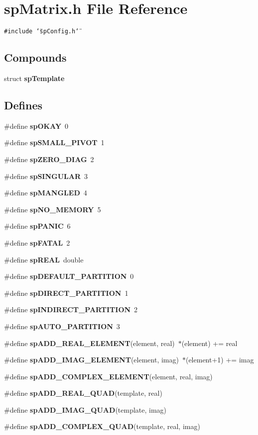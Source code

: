 \section{sp\-Matrix.h File Reference}
\label{spMatrix_8h}
{\tt \#include \char`\"{}sp\-Config.h\char`\"{}}\par
\subsection*{Compounds}
\begin{CompactItemize}
\item 
struct {\bf sp\-Template}
\end{CompactItemize}
\subsection*{Defines}
\begin{CompactItemize}
\item 
\#define {\bf sp\-OKAY}\ 0
\item 
\#define {\bf sp\-SMALL\_\-PIVOT}\ 1
\item 
\#define {\bf sp\-ZERO\_\-DIAG}\ 2
\item 
\#define {\bf sp\-SINGULAR}\ 3
\item 
\#define {\bf sp\-MANGLED}\ 4
\item 
\#define {\bf sp\-NO\_\-MEMORY}\ 5
\item 
\#define {\bf sp\-PANIC}\ 6
\item 
\#define {\bf sp\-FATAL}\ 2
\item 
\#define {\bf sp\-REAL}\ double
\item 
\#define {\bf sp\-DEFAULT\_\-PARTITION}\ 0
\item 
\#define {\bf sp\-DIRECT\_\-PARTITION}\ 1
\item 
\#define {\bf sp\-INDIRECT\_\-PARTITION}\ 2
\item 
\#define {\bf sp\-AUTO\_\-PARTITION}\ 3
\item 
\#define {\bf sp\-ADD\_\-REAL\_\-ELEMENT}(element, real)\ $\ast$(element) += real
\item 
\#define {\bf sp\-ADD\_\-IMAG\_\-ELEMENT}(element, imag)\ $\ast$(element+1) += imag
\item 
\#define {\bf sp\-ADD\_\-COMPLEX\_\-ELEMENT}(element, real, imag)
\item 
\#define {\bf sp\-ADD\_\-REAL\_\-QUAD}(template, real)
\item 
\#define {\bf sp\-ADD\_\-IMAG\_\-QUAD}(template, imag)
\item 
\#define {\bf sp\-ADD\_\-COMPLEX\_\-QUAD}(template, real, imag)
\end{CompactItemize}
